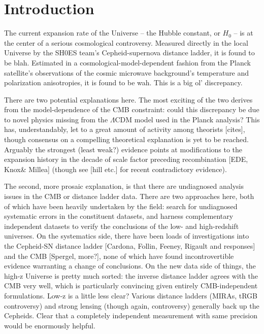 \documentclass[%
 reprint,
 superscriptaddress,
 nofootinbib,
 amsmath,amssymb,
 aps,
]{revtex4-2}
\begin{document}
\maketitle


\section{Introduction} \label{sec:intro}


The current expansion rate of the Universe -- the Hubble constant, or $H_0$ -- is at the center of a serious cosmological controversy. Measured directly in the local Universe by the SH0ES team's Cepheid-supernova distance ladder, it is found to be blah. Estimated in a cosmological-model-dependent fashion from the Planck satellite's observations of the cosmic microwave background's temperature and polarization anisotropies, it is found to be wah. This is a big ol' discrepancy.

There are two potential explanations here. The most exciting of the two derives from the model-dependence of the CMB constraint: could this discrepancy be due to novel physics missing from the $\Lambda$CDM model used in the Planck analysis? This has, understandably, let to a great amount of activity among theorists [cites], though consensus on a compelling theoretical explanation is yet to be reached. Arguably the strongest (least weak?) evidence points at modifications to the expansion history in the decade of scale factor preceding recombination [EDE, Knox\& Millea] (though see [hill etc.] for recent contradictory evidence).

The second, more prosaic explanation, is that there are undiagnosed analysis issues in the CMB or distance ladder data. There are two approaches here, both of which have been heavily undertaken by the field: search for undiagnosed systematic errors in the constituent datasets, and harness complementary independent datasets to verify the conclusions of the low- and high-redshift universes. On the systematics side, there have been loads of investigations into the Cepheid-SN distance ladder [Cardona, Follin, Feeney, Rigault and responses] and the CMB [Spergel, more?], none of which have found incontrovertible evidence warranting a change of conclusions. On the new data side of things, the high-z Universe is pretty much sorted: the inverse distance ladder agrees with the CMB very well, which is particularly convincing given entirely CMB-independent formulations. Low-z is a little less clear? Various distance ladders (MIRAs, tRGB controversy) and strong lensing (though again, controversy) generally back up the Cepheids. Clear that a completely independent measurement with same precision would be enormously helpful.
\end{document}
